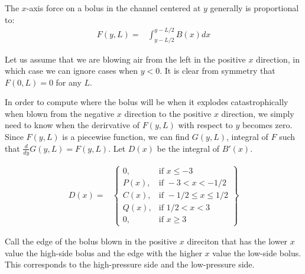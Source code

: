 \documentclass[]{asme2ej}
\begin{document}
The $x$-axis force on a bolus in the channel centered at $y$ generally is proportional to:
\begin{align}
  F(y,L) = & \int_{y-L/2}^{y-L/2} B(x) dx
\end{align}

Let us assume that we are blowing air from the left in the positive $x$ direction, in which case
we can ignore cases when $y < 0$. It is clear from symmetry that $ F(0,L) = 0 $ for any $L$.


In order to compute where the bolus will be when it explodes catastrophically when blown from
the negative $x$ direction to the positive $x$ direction, we simply need to know when the derirvative of
$F(y,L)$ with respect to $y$ becomes zero. Since $F(y,L)$ is a piecewise function, we can find $G(y,L)$,
integral of $F$ such that $\frac{d}{dy} G(y,L) = F(y,L)$. Let $D(x)$ be the integral of $B'(x)$.

\begin{align}
  D(x) =  &
\left\{
    \begin{array}{lr}
      0 , & \text{if } x \leq -3 \\
      P(x) , & \text{if } -3 < x  < -1/2 \\
      C(x) , & \text{if } -1/2 \leq x \leq 1/2 \\
      Q(x)   , & \text{if } 1/2 < x < 3 \\
      0 , & \text{if } x \geq 3
    \end{array}
    \right\}
    \label{eq:Dintegration}
\end{align}



Call the edge of the bolus blown in the positive $x$ direciton that has the lower $x$ value the high-side bolus and the edge with the higher $x$ value the low-side bolus.
This corresponds to the high-pressure side and the low-pressure side.
\end{document}
